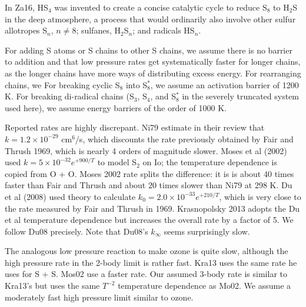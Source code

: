 \documentclass[12pt,landscape]{article}
\newcounter{reaction}
\begin{document}
In Za16, HS$_4$ was invented to create a concise catalytic cycle to reduce S$_8$ to H$_2$S in the deep atmosphere,
a process that would ordinarily also involve other sulfur allotropes S$_n$, $n\neq 8$; sulfanes, H$_2$S$_n$; and radicals HS$_n$.

For adding S atoms or S chains to other S chains, we assume there is no barrier to addition and that low pressure rates get systematically faster for longer chains, as the longer chains have more ways of distributing excess energy. For rearranging chains, we 
For breaking cyclic S$_8$ into S$_8^{\ast}$, we assume an activation barrier of 1200 K.
For breaking di-radical chains (S$_3$, S$_4$, and S$_8^{\ast}$ in the severely truncated system used here), we assume energy barriers of the order of 1000 K. 

  Reported rates are highly discrepant. 
 Ni79 estimate in their review that $k=1.2\!\times\! 10^{-29}$ cm$^6$/s, which discounts the rate previously obtained by Fair and Thrush 1969, which is nearly 4 orders of magnitude slower.
 Moses et al (2002) used $k=5\!\times\! 10^{-32}e^{+900/T}$ to model S$_2$ on Io;  the temperature dependence is copied from O + O.
 Moses 2002 rate splits the difference:  it is is about 40 times faster than Fair and Thrush and about 20 times slower than Ni79 at 298 K. 
 Du et al (2008) used theory to calculate $k_0=2.0\!\times\! 10^{-33}e^{ +210/T}$, which is very close to the rate measured by Fair and Thrush in 1969.
Krasnopolsky 2013 adopts the Du et al temperature dependence but increases the overall rate by a factor of 5.  
We follow Du08 precisely.  Note that Du08's $k_{\infty}$ seems surprisingly slow.  

  The analogous low pressure reaction to make ozone is quite slow, although the high pressure rate in the 2-body limit is rather fast.
Kra13 uses the same rate he uses for S + S.  Mos02 use a faster rate.  Our assumed 3-body rate is similar to Kra13's but uses the same $T^{-2}$ temperature dependence as Mo02.  We assume a moderately fast high pressure limit similar to ozone.
\end{document}
